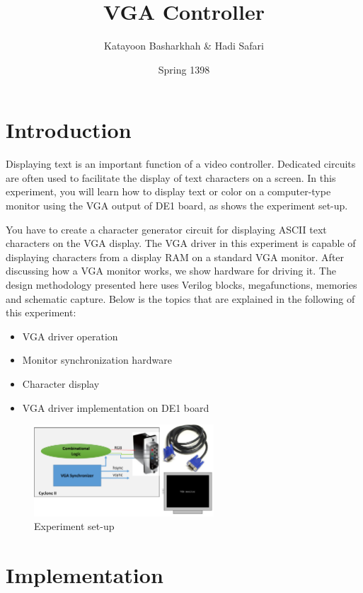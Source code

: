 \documentclass[12pt, logo=tehranDLDL/ut]{tehranDLDL}
\title{VGA Controller}
\author{Katayoon Basharkhah \& Hadi Safari}
\date{Spring 1398}
\begin{document}
\maketitle

\tableofcontents
\newpage

\section*{Introduction}

Displaying text is an important function of a video controller. Dedicated circuits are often used to facilitate the display of text characters on a screen. In this experiment, you will learn how to display text or color on a computer-type monitor using the VGA output of DE1 board, as  shows the experiment set-up.

You have to create a character generator circuit for displaying ASCII text characters on the VGA display. The VGA driver in this experiment is capable of displaying characters from a display RAM on a standard VGA monitor. After discussing how a VGA monitor works, we show hardware for driving it. The design methodology presented here uses Verilog blocks, megafunctions, memories and schematic capture. Below is the topics that are explained in the following of this experiment:

\begin{itemize}
    \item VGA driver operation
    \item Monitor synchronization hardware
    \item Character display
    \item VGA driver implementation on DE1 board
\end{itemize}

\begin{figure}[b]
    \centering
    \caption{Experiment set-up\label{fig:setup}}
    \includegraphics[width=0.6\textwidth]{setup}
\end{figure}

\section{Implementation\label{sec:imp}}
\end{document}
